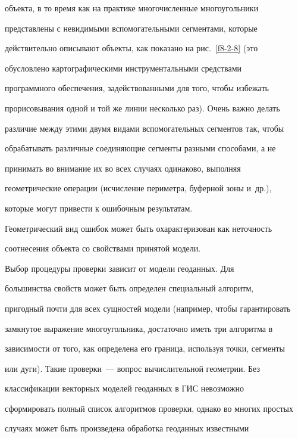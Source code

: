 \begin{enumerate}[(1)]
объекта, в то время как на практике многочисленные многоугольники 


представлены с невидимыми вспомогательными сегментами, которые 


действительно описывают объекты, как показано на рис.~\ref{f8-2-8} (это 


обусловлено картографическими инструментальными средствами 


программного обеспечения, задействованными для того, чтобы избежать 


прорисовывания одной и той же линии несколько раз). Очень важно делать 


различие между этими двумя видами вспомогательных сегментов так, чтобы 


обрабатывать различные соединяющие сегменты разными способами, а не 


принимать во внимание их во всех случаях одинаково, выполняя 


геометрические операции (исчисление периметра, буферной зоны и~др.), 


которые могут привести к ошибочным результатам. 


    \end{enumerate}


    


    Геометрический вид ошибок может быть охарактеризован как неточность 


соотнесения объекта со свойствами принятой модели. 


    


    Выбор процедуры проверки зависит от модели геоданных. Для 


большинства свойств может быть определен специальный алгоритм, 


пригодный почти для всех сущностей модели (например, чтобы гарантировать 


замкнутое выражение многоугольника, достаточно иметь три алгоритма в 


зависимости от того, как определена его граница, используя точки, сегменты 


или дуги). Такие проверки~--- вопрос вычислительной геометрии. Без 


классификации векторных моделей геоданных в ГИС невозможно 


сформировать полный список алгоритмов проверки, однако во многих простых 


случаях может быть произведена обработка геоданных известными 


